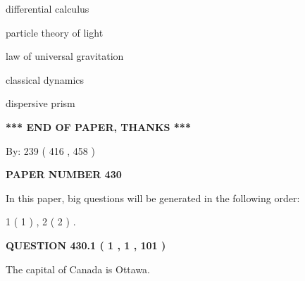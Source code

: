 \documentclass[12pt]{article}
\begin{document}
 
\noindent{}
 
 
differential calculus
 
 
particle theory of light
 
 
law of universal gravitation
 
 
classical dynamics
 
 
dispersive prism
 
 
 
 
   
   
\vspace{1.0in} 
{\textbf{\large{ *** END OF PAPER, THANKS *** }}} 
   
   
\hspace{1.0in} By: 
 239 ( 416 ,  458 )
   
   
   
   
\newpage 
\setcounter{page}{ 
   430001 } 
   
   
   
   
 {\textbf{ \Large{ PAPER NUMBER  430  }}}
   
   
\vspace{0.2in}
   
   
   
   
   
\vspace{0.2in}
   
In this paper, big questions will be generated in the following order: 
   
   
   1 ( 1 )
 ,
   2 ( 2 )
 .
  
\vspace{0.2in}
  
{\textbf{\Large{QUESTION
430.1 
 ( 1 , 1 , 101 )
}}}
  
  
 
 
\noindent{}
 
 
The capital of Canada is Ottawa.
 
 
 
 
  
\vspace{0.2in}
  
\end{document}
